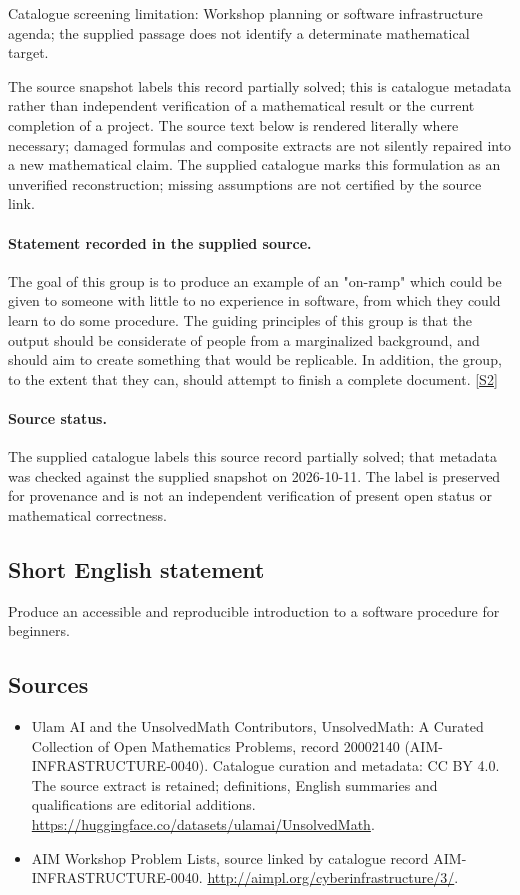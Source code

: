 \documentclass[11pt]{article}
\begin{document}
Catalogue screening limitation: Workshop planning or software infrastructure agenda; the supplied passage does not identify a determinate mathematical target.

The source snapshot labels this record partially solved; this is catalogue metadata rather than independent verification of a mathematical result or the current completion of a project.
The source text below is rendered literally where necessary; damaged formulas and composite extracts are not silently repaired into a new mathematical claim.
The supplied catalogue marks this formulation as an unverified reconstruction; missing assumptions are not certified by the source link.
\paragraph{Statement recorded in the supplied source.}
The goal of this group is to produce an example of an "on-ramp" which could be given to someone with little to no experience in software, from which they could learn to do some procedure. The guiding principles of this group is that the output should be considerate of people from a marginalized background, and should aim to create something that would be replicable. In addition, the group, to the extent that they can, should attempt to finish a complete document. \href{http://aimpl.org/cyberinfrastructure/3/}{[S2]}
\paragraph{Source status.}
The supplied catalogue labels this source record partially solved; that metadata was checked against the supplied snapshot on 2026-10-11. The label is preserved for provenance and is not an independent verification of present open status or mathematical correctness.
\subsection{Short English statement}
Produce an accessible and reproducible introduction to a software procedure for beginners.
\subsection{Sources}
\begin{itemize}
\item[S1] Ulam AI and the UnsolvedMath Contributors, UnsolvedMath: A Curated Collection of Open Mathematics Problems, record 20002140 (AIM-INFRASTRUCTURE-0040). Catalogue curation and metadata: CC BY 4.0. The source extract is retained; definitions, English summaries and qualifications are editorial additions.
\url{https://huggingface.co/datasets/ulamai/UnsolvedMath}.
\item[S2] AIM Workshop Problem Lists, source linked by catalogue record AIM-INFRASTRUCTURE-0040.
\url{http://aimpl.org/cyberinfrastructure/3/}.
\end{itemize}
\end{document}
